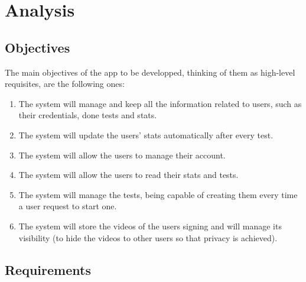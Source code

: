 \chapter{Analysis}

\section{Objectives}
The main objectives of the app to be developped, thinking of them as high-level requisites, are the following ones: 

\begin{enumerate}[label=\textbf{Obj\_\arabic*:}, align=left, leftmargin=*]
    \item The system will manage and keep all the information related to users, such as their credentials, done tests and stats.
    \item The system will update the users' stats automatically after every test. 
    \item The system will allow the users to manage their account.
    \item The system will allow the users to read their stats and tests.
    \item The system will manage the tests, being capable of creating them every time a user request to start one.
    \item The system will store the videos of the users signing and will manage its visibility (to hide the videos to other users so that privacy is achieved).
\end{enumerate}

\section{Requirements}
